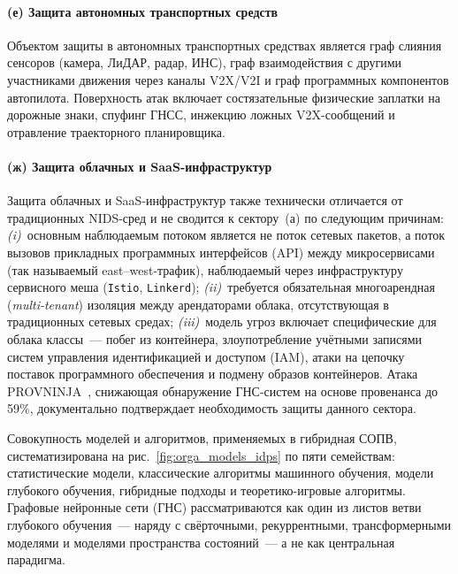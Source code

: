 \paragraph{(е) Защита автономных транспортных средств}\label{subsubsec:sector_av}

Объектом защиты в автономных транспортных средствах является граф
слияния сенсоров (камера, ЛиДАР, радар, ИНС), граф взаимодействия
с другими участниками движения через каналы V2X/V2I и граф
программных компонентов автопилота. Поверхность атак включает
состязательные физические заплатки на дорожные знаки, спуфинг
ГНСС, инжекцию ложных V2X-сообщений и отравление траекторного
планировщика.

\paragraph{(ж) Защита облачных и SaaS-инфраструктур}\label{subsubsec:sector_cloud}

Защита облачных и SaaS-инфраструктур также технически отличается от
традиционных NIDS-сред и не сводится к сектору~(а) по следующим
причинам:
\emph{(i)}~основным наблюдаемым потоком является не поток
сетевых пакетов, а поток вызовов прикладных программных интерфейсов
(API) между микросервисами (так называемый east--west-трафик),
наблюдаемый через инфраструктуру сервисного меша
(\texttt{Istio}, \texttt{Linkerd});
\emph{(ii)}~требуется обязательная многоарендная (\emph{multi-tenant})
изоляция между арендаторами облака, отсутствующая в традиционных
сетевых средах;
\emph{(iii)}~модель угроз включает специфические для облака классы~---
побег из контейнера, злоупотребление учётными записями систем
управления идентификацией и доступом (IAM), атаки на цепочку
поставок программного обеспечения и подмену образов контейнеров. Атака PROVNINJA~\cite{PROVNINJA2023}, снижающая обнаружение
ГНС-систем на основе провенанса до 59\%, документально подтверждает
необходимость защиты данного сектора.

\label{sec:idps_models_taxonomy}%

Совокупность моделей и алгоритмов, применяемых в гибридная СОПВ,
систематизирована на рис.~\ref{fig:orga_models_idps} по пяти
семействам: статистические модели, классические алгоритмы
машинного обучения, модели глубокого обучения, гибридные подходы и
теоретико-игровые алгоритмы. Графовые нейронные сети (ГНС)
рассматриваются как один из листов ветви глубокого обучения~---
наряду с свёрточными, рекуррентными, трансформерными моделями и
моделями пространства состояний~--- а не как центральная парадигма.

